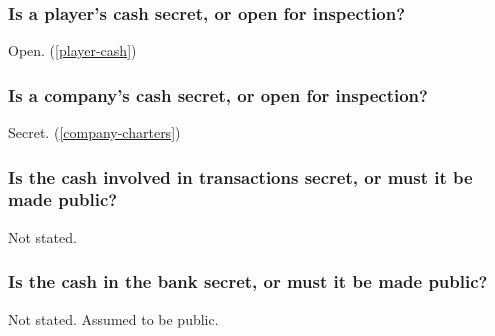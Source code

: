 \subsubsection{Is a player's cash secret, or open for inspection?}
Open. (\autoref{player-cash})

\subsubsection{Is a company's cash secret, or open for inspection?}
Secret. (\autoref{company-charters})

\subsubsection{Is the cash involved in transactions secret, or must it be
  made public?}
Not stated.

\subsubsection{Is the cash in the bank secret, or must it be made public?}
Not stated. Assumed to be public.